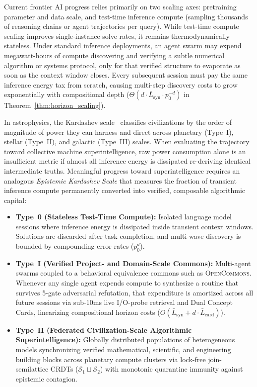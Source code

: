 \documentclass[10pt,twocolumn]{article}
\begin{document}
Current frontier AI progress relies primarily on two scaling axes: pretraining parameter and data scale, and test-time inference compute (sampling thousands of reasoning chains or agent trajectories per query). While test-time compute scaling improves single-instance solve rates, it remains thermodynamically stateless. Under standard inference deployments, an agent swarm may expend megawatt-hours of compute discovering and verifying a subtle numerical algorithm or systems protocol, only for that verified structure to evaporate as soon as the context window closes. Every subsequent session must pay the same inference energy tax from scratch, causing multi-step discovery costs to grow exponentially with compositional depth ($\Theta(d \cdot \bar{L}_{\text{syn}} \cdot p_0^{-d})$ in Theorem~\ref{thm:horizon_scaling}).

In astrophysics, the Kardashev scale~\cite{kardashev1964transmission} classifies civilizations by the order of magnitude of power they can harness and direct across planetary (Type~I), stellar (Type~II), and galactic (Type~III) scales. When evaluating the trajectory toward collective machine superintelligence, raw power consumption alone is an insufficient metric if almost all inference energy is dissipated re-deriving identical intermediate truths. Meaningful progress toward superintelligence requires an analogous \emph{Epistemic Kardashev Scale} that measures the fraction of transient inference compute permanently converted into verified, composable algorithmic capital:
\begin{itemize}
    \item \textbf{Type~0 (Stateless Test-Time Compute):} Isolated language model sessions where inference energy is dissipated inside transient context windows. Solutions are discarded after task completion, and multi-wave discovery is bounded by compounding error rates ($p_0^d$).
    \item \textbf{Type~I (Verified Project- and Domain-Scale Commons):} Multi-agent swarms coupled to a behavioral equivalence commons such as \textsc{OpenCommons}. Whenever any single agent expends compute to synthesize a routine that survives 5-gate adversarial refutation, that expenditure is amortized across all future sessions via sub-10ms live I/O-probe retrieval and Dual Concept Cards, linearizing compositional horizon costs ($O(\bar{L}_{\text{syn}} + d \cdot \bar{L}_{\text{card}})$).
    \item \textbf{Type~II (Federated Civilization-Scale Algorithmic Superintelligence):} Globally distributed populations of heterogeneous models synchronizing verified mathematical, scientific, and engineering building blocks across planetary compute clusters via lock-free join-semilattice CRDTs ($\mathcal{S}_1 \sqcup \mathcal{S}_2$) with monotonic quarantine immunity against epistemic contagion.
\end{itemize}
\end{document}

